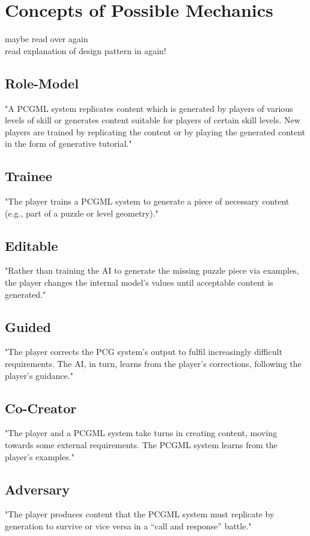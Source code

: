 \documentclass[MGS,Master,english]{twbook}%
\begin{document}
\section{Concepts of Possible Mechanics}
maybe read over \cite{pcg::endlessWeb} again\\
read explanation of design pattern in \cite{ai::aiBasedGameDesignPattern} again!

\subsection{Role-Model}
"A \ac{PCGML} system replicates content which is generated by players of various levels of skill or generates content suitable for players of certain skill levels. New players are trained by replicating the content or by playing the generated content in the form of generative tutorial." \cite{pcgml::paper}

\subsection{Trainee}
"The player trains a \ac{PCGML} system to generate a piece of necessary content (e.g., part of a puzzle or level geometry)." \cite{pcgml::paper}

\subsection{Editable}
"Rather than training the AI to generate the missing puzzle piece via examples, the player changes the internal model’s values until acceptable content is generated." \cite{pcgml::paper}

\subsection{Guided}
"The player corrects the \ac{PCG} system’s output to fulfil increasingly difficult requirements. The \ac{AI}, in turn, learns from the player’s corrections, following the player’s guidance." \cite{pcgml::paper}

\subsection{Co-Creator}
"The player and a \ac{PCGML} system take turns in creating content, moving towards some external requirements. The \ac{PCGML} system learns from the player’s examples." \cite{pcgml::paper} 

\subsection{Adversary}
"The player produces content that the \ac{PCGML} system must replicate by generation to survive or vice versa in a “call and response” battle." \cite{pcgml::paper}
\end{document}
